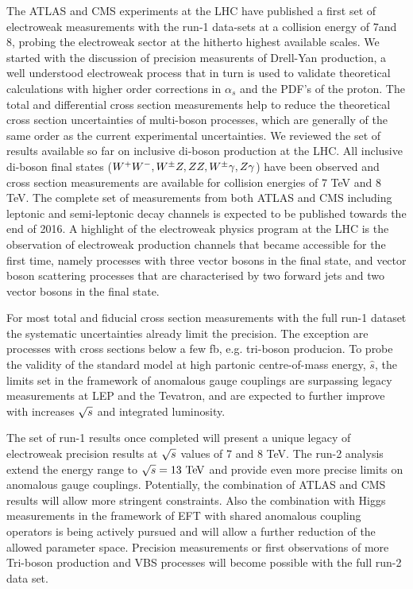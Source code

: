 The ATLAS and CMS experiments at the LHC have published a first set of electroweak measurements with the 
run-1 data-sets at a collision energy of 7\;\TeV and 8\;\TeV,
probing the electroweak sector at the hitherto highest available scales.
We started with the discussion of precision measurents of Drell-Yan production, a well understood electroweak
process that in turn is used to validate theoretical calculations with higher order corrections in
$\alpha_s$ and the PDF's of the proton. The total and differential cross section measurements help to 
reduce the theoretical cross section uncertainties of multi-boson processes, which are generally of the same order as the current
experimental uncertainties.  
We reviewed the set of results available so far on inclusive di-boson production at the LHC. All inclusive di-boson final states
($W^+W^-,W^{\pm}Z,ZZ,W^{\pm}\gamma,Z\gamma$) have been observed and cross section measurements are available for collision energies of 7 TeV and 8 TeV. 
The complete set of measurements from both ATLAS and CMS including leptonic and semi-leptonic decay channels
is expected to be published towards the end of 2016.
A highlight of the electroweak physics program at the LHC is the observation of electroweak production channels 
that became accessible for the first time, namely processes with 
three vector bosons in the final state, and vector boson scattering processes that are 
characterised by two forward jets and two vector bosons in the final state.

For most total and fiducial cross section measurements with the full run-1 dataset the systematic uncertainties 
already limit the precision. The exception are processes with cross sections below a few fb, e.g. tri-boson producion. 
To probe the validity of the standard model at high partonic centre-of-mass energy, $\hat{s}$, the limits
set in the framework of anomalous gauge couplings are surpassing legacy measurements at LEP and the Tevatron,
and are expected to further improve with increases $\sqrt{s}$ and integrated luminosity. 

The set of run-1 results once completed will present a unique legacy of electroweak precision results at 
$\sqrt{s}$ values of 7 and 8 TeV.
The run-2 analysis extend the energy range to $\rts=13\TeV$ 
and provide even more precise limits on anomalous gauge couplings. Potentially, 
the combination of ATLAS and CMS results will allow more stringent constraints. Also the combination
with Higgs measurements in the framework of EFT with shared anomalous coupling operators is being 
actively pursued and will allow a further reduction of the allowed parameter space. 
Precision measurements or first observations of more Tri-boson production and VBS processes will become possible with the full 
run-2 data set. 


 
